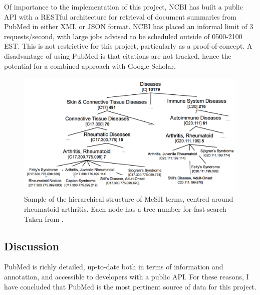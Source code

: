\documentclass[PROP_AGutteridge_CS.tex]{subfiles}
\begin{document}
\noindent Of importance to the implementation of this project, NCBI has built a public API with a RESTful architecture for retrieval of document summaries from PubMed in either XML or JSON format. NCBI has placed an informal limit of 3 requests/second, with large jobs advised to be scheduled outside of 0500-2100 EST\cite{eutils-usage}. This is not restrictive for this project, particularly as a proof-of-concept. A disadvantage of using PubMed is that citations are not tracked, hence the potential for a combined approach with Google Scholar. 

\begin{figure}[ht]
	\includegraphics[width=\textwidth]{../lib/images/MeSH}
	\caption{Sample of the hierarchical structure of MeSH terms, centred around rheumatoid arthritis. Each node has a tree number for fast search Taken from \cite{stoyanovich}.}
\end{figure}

\subsection{Discussion}
PubMed is richly detailed, up-to-date both in terms of information and annotation, and accessible to developers with a public API. For these reasons, I have concluded that PubMed is the most pertinent source of data for this project.
\end{document}

